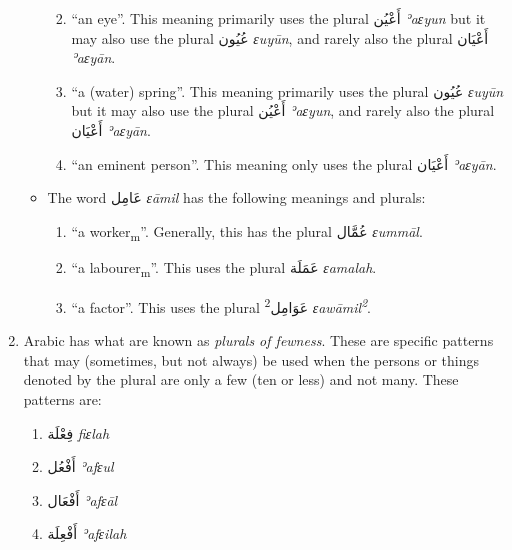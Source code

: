 \documentclass[
  10pt,
]{book}
\providecommand{\tightlist}{%
  \setlength{\itemsep}{0pt}\setlength{\parskip}{0pt}}
\begin{document}
\begin{enumerate}
\begin{itemize}
    \begin{enumerate}
    \def\labelenumii{\roman{enumii}.}
    \tightlist
    \item
      \enquote{an eye}. This meaning primarily uses the plural \foreignlanguage{arabic}{أَعْيُن} \emph{ʾaɛyun} but it may also use the plural \foreignlanguage{arabic}{عُيُون} \emph{ɛuyūn}, and rarely also the plural \foreignlanguage{arabic}{أَعْيَان} \emph{ʾaɛyān}.
    \item
      \enquote{a (water) spring}. This meaning primarily uses the plural \foreignlanguage{arabic}{عُيُون} \emph{ɛuyūn} but it may also use the plural \foreignlanguage{arabic}{أَعْيُن} \emph{ʾaɛyun}, and rarely also the plural \foreignlanguage{arabic}{أَعْيَان} \emph{ʾaɛyān}.
    \item
      \enquote{an eminent person}. This meaning only uses the plural \foreignlanguage{arabic}{أَعْيَان} \emph{ʾaɛyān}.
    \end{enumerate}
  \item
    The word \foreignlanguage{arabic}{عَامِل} \emph{ɛāmil} has the following meanings and plurals:

    \begin{enumerate}
    \def\labelenumii{\roman{enumii}.}
    \tightlist
    \item
      \enquote{a worker\textsubscript{m}}. Generally, this has the plural \foreignlanguage{arabic}{عُمَّال} \emph{ɛummāl}.
    \item
      \enquote{a labourer\textsubscript{m}}. This uses the plural \foreignlanguage{arabic}{عَمَلَة} \emph{ɛamalah}.
    \item
      \enquote{a factor}. This uses the plural \foreignlanguage{arabic}{عَوَامِل\textsuperscript{2}} \emph{ɛawāmil\textsuperscript{2}}.
    \end{enumerate}
  \end{itemize}
\item
  Arabic has what are known as \emph{plurals of fewness}. These are specific patterns that may (sometimes, but not always) be used when the persons or things denoted by the plural are only a few (ten or less) and not many. These patterns are:

  \begin{enumerate}
  \def\labelenumii{\roman{enumii}.}
  \tightlist
  \item
    \foreignlanguage{arabic}{فِعْلَة} \emph{fiɛlah}
  \item
    \foreignlanguage{arabic}{أَفْعُل} \emph{ʾafɛul}
  \item
    \foreignlanguage{arabic}{أَفْعَال} \emph{ʾafɛāl}
  \item
    \foreignlanguage{arabic}{أَفْعِلَة} \emph{ʾafɛilah}
  \end{enumerate}


\end{enumerate}
\end{document}
